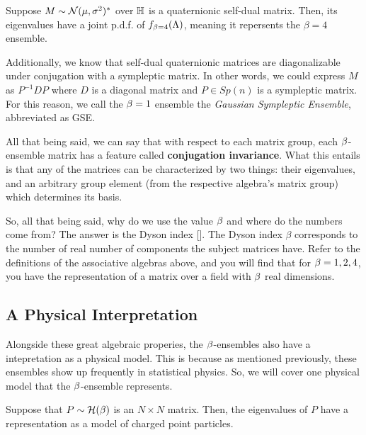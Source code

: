 \bigskip

 Suppose $M \sim \mathcal{N}(\mu,\sigma^2)^*$ over $\mathbb{H}$ is a quaternionic self-dual matrix.
Then, its eigenvalues have a joint p.d.f. of $f_{\beta = 4}(\Lambda)$, meaning it repersents the $\beta = 4$ ensemble.

Additionally, we know that self-dual quaternionic matrices are diagonalizable under conjugation with a sympleptic matrix.
In other words, we could express $M$ as $P^{-1} D P$ where $D$ is a diagonal matrix and $P \in Sp(n)$ is a sympleptic matrix.
For this reason, we call the $\beta = 1$ ensemble the \textit{Gaussian Sympleptic Ensemble}, abbreviated as GSE.

\bigskip

All that being said, we can say that with respect to each matrix group, each $\beta$-ensemble matrix has a feature called
\textbf{conjugation invariance}. What this entails is that any of the matrices can be characterized by two things: their eigenvalues, and an arbitrary group element (from the respective algebra's matrix group) which determines its basis.

\newpage

So, all that being said, why do we use the value $\beta$ and where do the numbers come from? The answer is the Dyson index [\cite{tao}].
The Dyson index $\beta$ corresponds to the number of real number of components the subject matrices have. Refer to the definitions
of the associative algebras above, and you will find that for $\beta = 1,2,4$, you have the representation of a matrix over a field with $\beta$ real dimensions.


\newpage
\subsection{A Physical Interpretation}

Alongside these great algebraic properies, the $\beta$-ensembles also have a intepretation as a physical model.
This is because as mentioned previously, these ensembles show up frequently in statistical physics.
So, we will cover one physical model that the $\beta$-ensemble represents.

Suppose that $P \sim \mathcal{H}(\beta)$ is an $N \times N$ matrix. Then, the eigenvalues of $P$ have a representation as a model of charged point particles.

